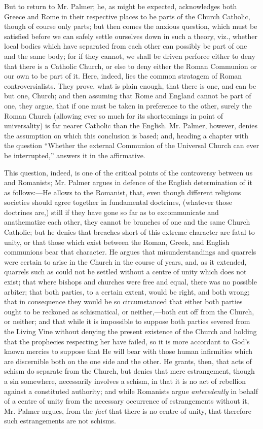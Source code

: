 But to return to Mr. Palmer; he, as might be
expected, acknowledges both Greece and Rome in their respective places
to be parts of the Church Catholic, though of course only parts; but
then comes the anxious question, which must be satisfied before we can
safely settle ourselves down in such a theory, viz., whether local
bodies which have separated from each other can possibly be part of
one and the same body; for if they cannot, we shall be driven perforce
either to deny that there is a Catholic Church, or else to deny either
the Roman Communion or our own to be part of it. Here, indeed, lies
the common stratagem of Roman controversialists. They prove, what is
plain enough, that there is one, and can be but one, Church; and then
assuming that Rome and England cannot be part of one, they
argue, that if one must be taken in preference to the other, surely
the Roman Church (allowing ever so much for its shortcomings in point
of universality) is far nearer Catholic than the English. Mr. Palmer,
however, denies the assumption on which this conclusion is based; and,
heading a chapter with the question ``Whether the external Communion of
the Universal Church can ever be interrupted,'' answers it in the
affirmative.

This question, indeed, is one of the critical
points of the controversy between us and Romanists; Mr. Palmer argues
in defence of the English determination of it as follows:—He allows
to the Romanist, that, even though different religious societies
should agree together in fundamental doctrines, (whatever those
doctrines are,) still if they have gone so far as to excommunicate and
anathematize each other, they cannot be branches of one and the same
Church Catholic; but he denies that breaches short of this extreme
character are fatal to unity, or that those which exist between the
Roman, Greek, and English communions bear that character. He argues
that misunderstandings and quarrels were certain to arise in the
Church in the course of years, and, as it extended, quarrels such as
could not be settled without a centre of unity which does not exist;
that where bishops and churches were free and equal, there was no
possible arbiter; that both parties, to a certain extent, would be
right, and both wrong; that in consequence they would be so
circumstanced that either both parties ought to be reckoned as
schismatical, or neither,—both cut off from the Church, or neither;
and that while it is impossible to suppose both parties severed from
the Living Vine without denying the present existence of the Church
and holding that the prophecies respecting her have failed, so
it is more accordant to God's known mercies to suppose that He will
bear with those human infirmities which are discernible both on the
one side and the other. He grants, then, that acts of schism do
separate from the Church, but denies that mere estrangement, though a
sin somewhere, necessarily involves a schism, in that it is no act of
rebellion against a constituted authority; and while Romanists argue \emph{antecedently}
in behalf of a centre of unity from the necessary occurrence of
estrangements without it, Mr. Palmer argues, from the \emph{fact} that
there is no centre of unity, that therefore such estrangements are not
schisms.

